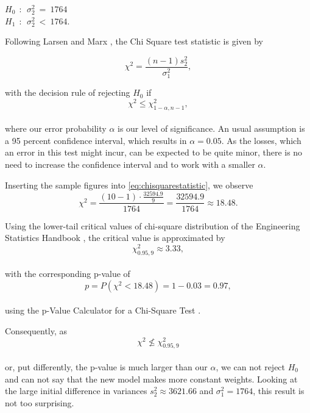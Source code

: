 \begin{center}
$H_0~~:~~ \sigma^2_2~=~1764$\\ 
$H_1~~:~~ \sigma^2_2~<~1764$.
\end{center}

Following Larsen and Marx \cite[Chapter 7.5]{larsen2005introduction}, the Chi Square test statistic is given by 

\begin{equation}
\chi^2 = \frac{(n-1)s_2^2}{\sigma_1^2},
\label{eq:chisquarestatistic}
\end{equation}

with the decision rule of rejecting $H_0$ if 
\\
\begin{equation}
\chi^2 \leq \chi^2_{1-\alpha,n-1},
\label{eq:decisionrule}
\end{equation}
\\
where our error probability $\alpha$ is our level of significance. An usual assumption is a 95 percent confidence interval, which results in $\alpha = 0.05$. As the losses, which an error in this test might incur, can be expected to be quite minor, there is no need to increase the confidence interval and to work with a smaller $\alpha$.


Inserting the sample figures into \eqref{eq:chisquarestatistic}, we observe 
\begin{equation}
\chi^2 = \frac{(10-1) \cdot \frac{32594.9}{9}}{1764} = \frac{32594.9}{1764} \approx 18.48.
\label{eq:chisqstatcalc}
\end{equation}

Using the lower-tail critical values of chi-square distribution of the Engineering Statistics Handbook \cite{nist}, the critical value is approximated by 
\\
\begin{equation}
\chi^2_{0.95,9}\approx 3.33,
\label{eq:criticalvalue}
\end{equation}
\\
with the corresponding p-value of
\\
\begin{equation}
p = P(\chi^2 < 18.48) = 1-0.03 = 0.97,
\label{eq:pvalue}
\end{equation}
\\
using the p-Value Calculator for a Chi-Square Test \cite{freepvalue}. 

Consequently, as 
\\
\begin{equation}
\chi^2 \nleq \chi^2_{0.95,9}
\label{eq:criticalvalue}
\end{equation}
\\
or, put differently, the p-value is much larger than our $\alpha$, we can not reject $H_0$ and can not say that the new model makes more constant weights. Looking at the large initial difference in variances $s_2^2 \approx 3621.66 $ and $\sigma^2_1 = 1764$, this result is not too surprising. 



